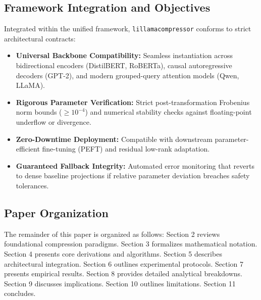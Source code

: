 \subsection{Framework Integration and Objectives}
Integrated within the unified framework, \texttt{lillamacompressor} conforms to strict architectural contracts:
\begin{itemize}
\item \textbf{Universal Backbone Compatibility:} Seamless instantiation across bidirectional encoders (DistilBERT, RoBERTa), causal autoregressive decoders (GPT-2), and modern grouped-query attention models (Qwen, LLaMA).
\item \textbf{Rigorous Parameter Verification:} Strict post-transformation Frobenius norm bounds ($\ge 10^{-4}$) and numerical stability checks against floating-point underflow or divergence.
\item \textbf{Zero-Downtime Deployment:} Compatible with downstream parameter-efficient fine-tuning (PEFT) and residual low-rank adaptation.
\item \textbf{Guaranteed Fallback Integrity:} Automated error monitoring that reverts to dense baseline projections if relative parameter deviation breaches safety tolerances.
\end{itemize}

\subsection{Paper Organization}
The remainder of this paper is organized as follows: Section 2 reviews foundational compression paradigms. Section 3 formalizes mathematical notation. Section 4 presents core derivations and algorithms. Section 5 describes architectural integration. Section 6 outlines experimental protocols. Section 7 presents empirical results. Section 8 provides detailed analytical breakdowns. Section 9 discusses implications. Section 10 outlines limitations. Section 11 concludes.
